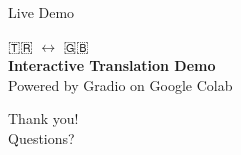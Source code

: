 \documentclass[aspectratio=169]{beamer}
\begin{document}
\begin{frame}{Live Demo}
  \begin{center}
    \Huge 🇹🇷 $\leftrightarrow$ 🇬🇧 \\[1cm]
    \Large \textbf{Interactive Translation Demo} \\[0.5cm]
    \normalsize Powered by Gradio on Google Colab
  \end{center}
\end{frame}

\begin{frame}[standout]
  Thank you! \\[0.5cm]
  \normalsize Questions?
\end{frame}
\end{document}
